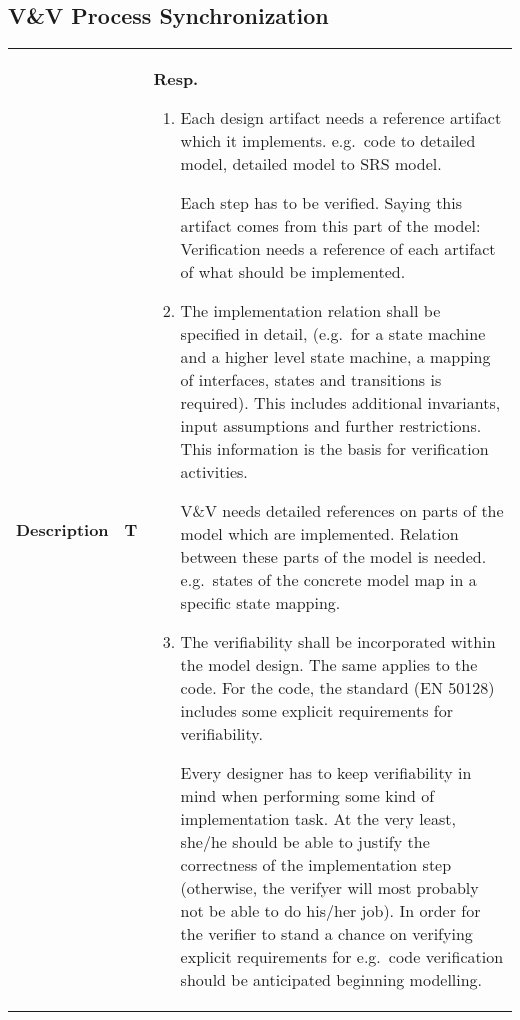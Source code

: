\documentclass[a4paper]{article}
\begin{document}
\subsection{V\&V Process Synchronization} %

\begin{longtable}{|p{}|p{}|p{}|}
\hline
\textbf{Description} & \textbf{T} & \textbf{Resp.} 
\endhead
\hline


	    \hline
\begin{enumerate}
\item Each design artifact needs a reference artifact which it
  implements.  e.g.\ code to detailed model, detailed model to SRS
  model.
		
        Each step has to be verified. Saying this artifact comes from
        this part of the model: Verification needs a reference of each
        artifact of what should be implemented.
      \item The implementation relation shall be specified in detail,
        (e.g.\ for a state machine and a higher level state machine, a
        mapping of interfaces, states and transitions is required).
        This includes additional invariants, input assumptions and
        further restrictions. This information is the basis for
        verification activities.
		
        V\&V needs detailed references on parts of the model which are
        implemented.  Relation between these parts of the model is
        needed.  e.g.\ states of the concrete model map in a specific
        state mapping.

      \item The verifiability shall be incorporated within the model
        design. The same applies to the code. For the code, the
        standard (EN 50128) includes some explicit requirements for
        verifiability.

        Every designer has to keep verifiability in mind when
        performing some kind of implementation task.  At the very
        least, she/he should be able to justify the correctness of the
        implementation step (otherwise, the verifyer will most
        probably not be able to do his/her job). In order for the
        verifier to stand a chance on verifying explicit requirements
        for e.g.\ code verification should be anticipated beginning
        modelling.


\end{enumerate}
\end{longtable}
\end{document}
